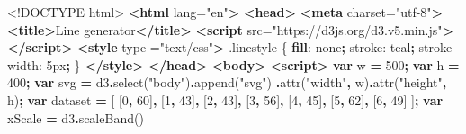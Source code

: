 \documentclass[
  openany]{book}
\newenvironment{Shaded}{\begin{snugshade}}{\end{snugshade}}
\newcommand{\ConstantTok}[1]{\textcolor[rgb]{0.00,0.00,0.00}{#1}}
\newcommand{\DataTypeTok}[1]{\textcolor[rgb]{0.13,0.29,0.53}{#1}}
\newcommand{\DecValTok}[1]{\textcolor[rgb]{0.00,0.00,0.81}{#1}}
\newcommand{\FunctionTok}[1]{\textcolor[rgb]{0.00,0.00,0.00}{#1}}
\newcommand{\KeywordTok}[1]{\textcolor[rgb]{0.13,0.29,0.53}{\textbf{#1}}}
\newcommand{\NormalTok}[1]{#1}
\newcommand{\OperatorTok}[1]{\textcolor[rgb]{0.81,0.36,0.00}{\textbf{#1}}}
\newcommand{\OtherTok}[1]{\textcolor[rgb]{0.56,0.35,0.01}{#1}}
\newcommand{\StringTok}[1]{\textcolor[rgb]{0.31,0.60,0.02}{#1}}
\begin{document}
\begin{Shaded}
\begin{Highlighting}[]
\DataTypeTok{\textless{}!DOCTYPE }\NormalTok{html}\DataTypeTok{\textgreater{}}
\KeywordTok{\textless{}html}\OtherTok{ lang=}\StringTok{"en"}\KeywordTok{\textgreater{}}
  \KeywordTok{\textless{}head\textgreater{}}
    \KeywordTok{\textless{}meta}\OtherTok{ charset=}\StringTok{"utf{-}8"}\KeywordTok{\textgreater{}}
    \KeywordTok{\textless{}title\textgreater{}}\NormalTok{Line generator}\KeywordTok{\textless{}/title\textgreater{}}
    \KeywordTok{\textless{}script}\OtherTok{ src=}\StringTok{"https://d3js.org/d3.v5.min.js"}\KeywordTok{\textgreater{}\textless{}/script\textgreater{}}
    \KeywordTok{\textless{}style}\OtherTok{ type} \OtherTok{=}\StringTok{"text/css"}\KeywordTok{\textgreater{}}
      \FunctionTok{.linestyle}\NormalTok{ \{}
        \KeywordTok{fill}\NormalTok{: }\DecValTok{none}\OperatorTok{;}
\NormalTok{        stroke: }\ConstantTok{teal}\OperatorTok{;}
\NormalTok{        stroke{-}width: }\DecValTok{5}\DataTypeTok{px}\OperatorTok{;}
\NormalTok{      \}}
    \KeywordTok{\textless{}/style\textgreater{}}
  \KeywordTok{\textless{}/head\textgreater{}}
  \KeywordTok{\textless{}body\textgreater{}}
    \KeywordTok{\textless{}script\textgreater{}}
      \KeywordTok{var}\NormalTok{ w }\OperatorTok{=} \DecValTok{500}\OperatorTok{;}
      \KeywordTok{var}\NormalTok{ h }\OperatorTok{=} \DecValTok{400}\OperatorTok{;}
      \KeywordTok{var}\NormalTok{ svg }\OperatorTok{=}\NormalTok{ d3}\OperatorTok{.}\FunctionTok{select}\NormalTok{(}\StringTok{"body"}\NormalTok{)}\OperatorTok{.}\FunctionTok{append}\NormalTok{(}\StringTok{"svg"}\NormalTok{)}
          \OperatorTok{.}\FunctionTok{attr}\NormalTok{(}\StringTok{"width"}\OperatorTok{,}\NormalTok{ w)}\OperatorTok{.}\FunctionTok{attr}\NormalTok{(}\StringTok{"height"}\OperatorTok{,}\NormalTok{ h)}\OperatorTok{;}
      \KeywordTok{var}\NormalTok{ dataset }\OperatorTok{=}\NormalTok{ [ [}\DecValTok{0}\OperatorTok{,} \DecValTok{60}\NormalTok{]}\OperatorTok{,}\NormalTok{ [}\DecValTok{1}\OperatorTok{,} \DecValTok{43}\NormalTok{]}\OperatorTok{,}\NormalTok{ [}\DecValTok{2}\OperatorTok{,} \DecValTok{43}\NormalTok{]}\OperatorTok{,}\NormalTok{ [}\DecValTok{3}\OperatorTok{,} \DecValTok{56}\NormalTok{]}\OperatorTok{,}
\NormalTok{          [}\DecValTok{4}\OperatorTok{,} \DecValTok{45}\NormalTok{]}\OperatorTok{,}\NormalTok{ [}\DecValTok{5}\OperatorTok{,} \DecValTok{62}\NormalTok{]}\OperatorTok{,}\NormalTok{ [}\DecValTok{6}\OperatorTok{,} \DecValTok{49}\NormalTok{] ]}\OperatorTok{;}
      \KeywordTok{var}\NormalTok{ xScale }\OperatorTok{=}\NormalTok{ d3}\OperatorTok{.}\FunctionTok{scaleBand}\NormalTok{()}

\end{Highlighting}
\end{Shaded}
\end{document}

